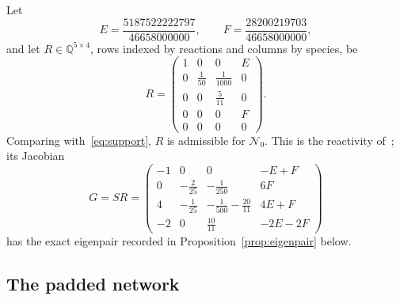 \documentclass[11pt,a4paper]{article}
\theoremstyle{plain}
\theoremstyle{definition}
\theoremstyle{remark}
\newcommand{\Q}{\mathbb{Q}}
\newcommand{\Nbig}{5187522222797}
\newcommand{\Mbig}{28200219703}
\newcommand{\Dbig}{46658000000}
\begin{document}
Let
\begin{equation}\label{eq:EF}
  E=\frac{\Nbig}{\Dbig},\qquad F=\frac{\Mbig}{\Dbig},
\end{equation}
and let $R\in\Q^{5\times4}$, rows indexed by reactions and columns by species, be
\begin{equation}\label{eq:R}
R=\begin{pmatrix}1&0&0&E\\0&\frac1{50}&\frac1{1000}&0\\0&0&\frac5{11}&0\\0&0&0&F\\0&0&0&0\end{pmatrix}.
\end{equation}
Comparing with~\eqref{eq:support}, $R$ is admissible for $\mathcal N_0$. This is the reactivity of~\cite{Companion2026}; its Jacobian
\begin{equation}\label{eq:G}
  G=SR=\begin{pmatrix}-1&0&0&-E+F\\[1pt]0&-\frac2{25}&-\frac1{250}&6F\\[1pt]4&-\frac1{25}&-\frac1{500}-\frac{20}{11}&4E+F\\[1pt]-2&0&\frac{10}{11}&-2E-2F\end{pmatrix}
\end{equation}
has the exact eigenpair recorded in Proposition~\ref{prop:eigenpair} below.

\subsection{The padded network}
\end{document}
